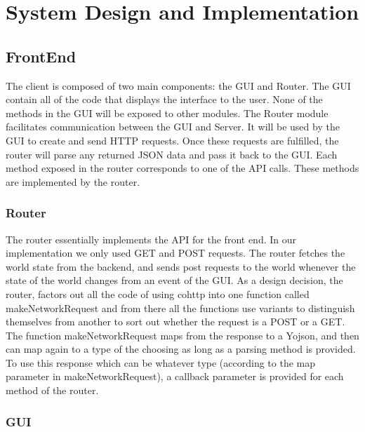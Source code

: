 \documentclass{article}
\begin{document}
    \section{System Design and Implementation}
	\subsection{FrontEnd}
	
	The client is composed of two main components: the GUI and Router. The GUI contain all of the code that displays the interface to the user. None of the methods in the GUI will be exposed to other modules. The Router module facilitates communication between the GUI and Server. It will be used by the GUI to create and send HTTP requests. Once these requests are fulfilled, the router will parse any returned JSON data and pass it back to the GUI. Each method exposed in the router corresponds to one of the API calls. These methods are implemented by the router.
	
	\subsubsection{Router}
	
	The router essentially implements the API for the front end. In our implementation we only used GET and POST requests. The router fetches the world state from the backend, and sends post requests to the world whenever the state of the world changes from an event of the GUI. As a design decision, the router, factors out all the code of using cohttp into one function called makeNetworkRequest and from there all the functions use variants to distinguish themselves from another to sort out whether the request is a POST or a GET. The function makeNetworkRequest maps from the response to a Yojson, and then can map again to a type of the choosing as long as a parsing method is provided. To use this response which can be whatever type (according to the map parameter in makeNetworkRequest), a callback parameter is provided for each method of the router.
	
	\subsubsection{GUI}
	
\end{document}
